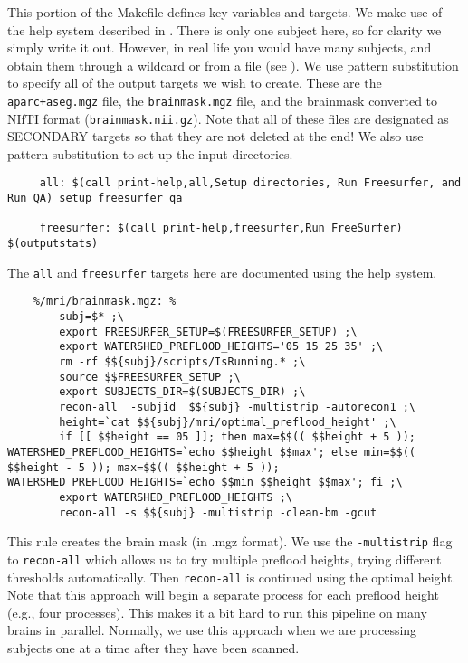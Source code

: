 This portion of the Makefile defines key variables and targets. 
 We make use of the help system described in
. 
 There is only one subject here, so for clarity we simply
write it out. However, in real life you would have many subjects, and
obtain them through a wildcard or from a file (see
).
 We use pattern substitution to specify all of the output
targets we wish to create. These are the \texttt{aparc+aseg.mgz} file,
the \texttt{brainmask.mgz} file, and the brainmask converted to NIfTI
format (\texttt{brainmask.nii.gz}). Note that all of these files are
designated as SECONDARY targets so that they are not deleted at the end!
 We also use pattern substitution to set up the input directories.


\begin{lstlisting}
	 all: $(call print-help,all,Setup directories, Run Freesurfer, and Run QA) setup freesurfer qa

	 freesurfer: $(call print-help,freesurfer,Run FreeSurfer) $(outputstats)
\end{lstlisting}

The \texttt{all} and \texttt{freesurfer} targets here are documented
using the help system. 

\begin{lstlisting}
	%/mri/brainmask.mgz: %
		subj=$* ;\
		export FREESURFER_SETUP=$(FREESURFER_SETUP) ;\
		export WATERSHED_PREFLOOD_HEIGHTS='05 15 25 35' ;\
		rm -rf $${subj}/scripts/IsRunning.* ;\
		source $$FREESURFER_SETUP ;\
		export SUBJECTS_DIR=$(SUBJECTS_DIR) ;\
		recon-all  -subjid  $${subj} -multistrip -autorecon1 ;\
		height=`cat $${subj}/mri/optimal_preflood_height' ;\
		if [[ $$height == 05 ]]; then max=$$(( $$height + 5 )); WATERSHED_PREFLOOD_HEIGHTS=`echo $$height $$max'; else min=$$(( $$height - 5 )); max=$$(( $$height + 5 )); WATERSHED_PREFLOOD_HEIGHTS=`echo $$min $$height $$max'; fi ;\
		export WATERSHED_PREFLOOD_HEIGHTS ;\
		recon-all -s $${subj} -multistrip -clean-bm -gcut
\end{lstlisting}

This rule creates the brain mask (in .mgz format). We use the
\texttt{-multistrip} flag to \texttt{recon-all} which allows us to try
multiple preflood heights, trying different thresholds
automatically. Then \texttt{recon-all} is continued using the optimal
height. Note that this approach will begin a separate process
for each preflood height (e.g., four processes). This makes it a bit
hard to run this pipeline on many brains in parallel. Normally, we use
this approach when we are processing subjects one at a time after they
have been scanned.


